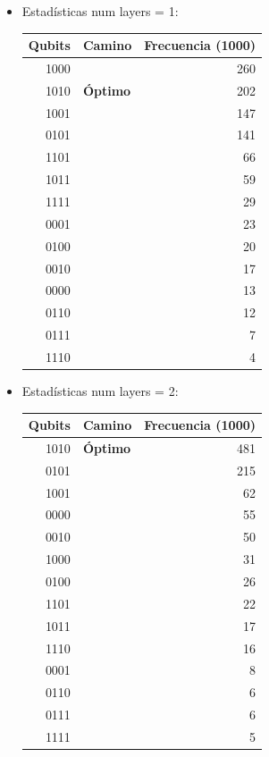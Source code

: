 \documentclass[letterpaper]{article}
\begin{document}
\begin{itemize}
\item Estadísticas num layers = 1:
\begin{center}
\begin{tabular}{|r|l|r|}
\hline
\textbf{Qubits} & \textbf{Camino} & \textbf{Frecuencia} (1000)\\
\hline
1000 &  & 260\\
1010 & \textbf{Óptimo} & 202\\
1001 &  & 147\\
0101 &  & 141\\
1101 &  & 66\\
1011 &  & 59\\
1111 &  & 29\\
0001 &  & 23\\
0100 &  & 20\\
0010 &  & 17\\
0000 &  & 13\\
0110 &  & 12\\
0111 &  & 7\\
1110 &  & 4\\
\hline
\end{tabular}
\end{center}

\item Estadísticas num layers = 2:
\begin{center}
\begin{tabular}{|r|l|r|}
\hline
\textbf{Qubits} & \textbf{Camino} & \textbf{Frecuencia} (1000)\\
\hline
1010 & \textbf{Óptimo} & 481\\
0101 &  & 215\\
1001 &  & 62\\
0000 &  & 55\\
0010 &  & 50\\
1000 &  & 31\\
0100 &  & 26\\
1101 &  & 22\\
1011 &  & 17\\
1110 &  & 16\\
0001 &  & 8\\
0110 &  & 6\\
0111 &  & 6\\
1111 &  & 5\\
\hline
\end{tabular}
\end{center}


\end{itemize}
\end{document}
